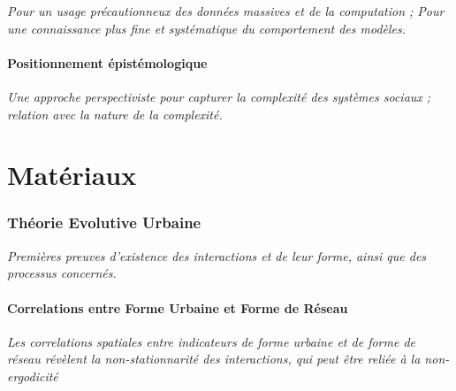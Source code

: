 \textit{Pour un usage précautionneux des données massives et de la computation ; Pour une connaissance plus fine et systématique du comportement des modèles.}



\subsection{Positionnement épistémologique}


\textit{Une approche perspectiviste pour capturer la complexité des systèmes sociaux ; relation avec la nature de la complexité.}















\part{Matériaux}



\section{Théorie Evolutive Urbaine}

\textit{Premières preuves d'existence des interactions et de leur forme, ainsi que des processus concernés.}

\subsection{Correlations entre Forme Urbaine et Forme de Réseau}

\textit{Les correlations spatiales entre indicateurs de forme urbaine et de forme de réseau révèlent la non-stationnarité des interactions, qui peut être reliée à la non-ergodicité}


